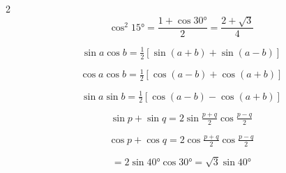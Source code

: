 \documentclass[12pt,twoside]{article}
\begin{document}
\begin{multicols}{2}
$$\cos^2 15° = \frac{1+\cos 30°}{2} = \frac{2+\sqrt{3}}{4}$$


$$\sin a \cos b = \tfrac{1}{2}[\sin(a{+}b)+\sin(a{-}b)]$$

$$\cos a \cos b = \tfrac{1}{2}[\cos(a{-}b)+\cos(a{+}b)]$$

$$\sin a \sin b = \tfrac{1}{2}[\cos(a{-}b)-\cos(a{+}b)]$$


$$\sin p + \sin q = 2\sin\!\tfrac{p+q}{2}\cos\!\tfrac{p-q}{2}$$

$$\cos p + \cos q = 2\cos\!\tfrac{p+q}{2}\cos\!\tfrac{p-q}{2}$$


$$= 2\sin 40°\cos 30° = \sqrt{3}\sin 40°$$


\end{multicols}


\end{document}
